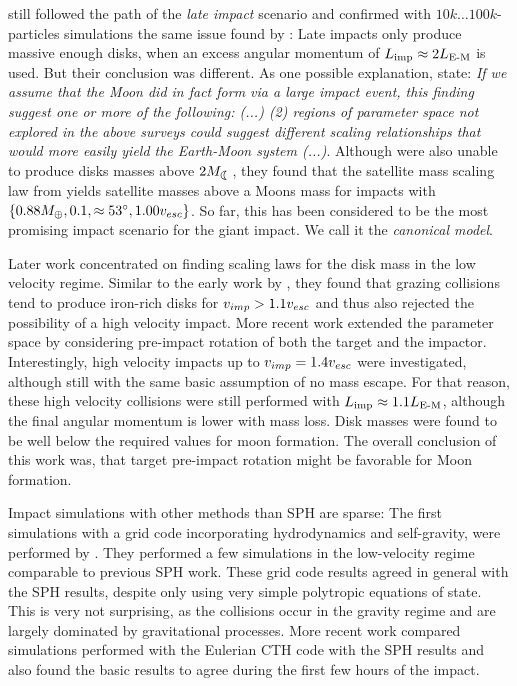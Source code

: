 \cite{Canup:2001p3295} still followed the path of the \emph{late impact} scenario and confirmed with $10k \dots100k$-particles simulations the same issue found by \cite{Cameron:2000p1854}: Late impacts only produce massive enough disks, when an excess angular momentum of $L_{\textrm{imp}} \approx 2 L_{\textrm{E-M}}$ is used. But their conclusion was different. As one possible explanation, \cite{Canup:2001p3295} state: \emph{If we assume that the Moon did in fact form via a large impact event, this finding suggest one or more of the following: (...) (2) regions of parameter space not explored in the above surveys could suggest different scaling relationships that would more easily yield the Earth-Moon system (...)}. Although \cite{Canup:2001p1861} were also unable to produce disks masses above $2 \ML$, they found that the satellite mass scaling law from  \citep{Kokubo:2000p2195} yields satellite masses above a Moons mass for impacts with $\{0.88 M_{\oplus}, 0.1, \approx 53 ^\circ, 1.00 v_{esc} \}$. So far, this has been considered to be the most promising impact scenario for the giant impact. We call it the \emph{canonical model}.

Later work \citep{Canup:2004p115} concentrated on finding scaling laws for the disk mass in the low velocity regime. Similar to the early work by \cite{Benz:1989p1893}, they found that grazing collisions tend to produce iron-rich disks for $v_{imp} > 1.1 v_{esc}$ and thus also rejected the possibility of a high velocity impact. More recent work \citep{Canup:2008p3551} extended the parameter space by considering pre-impact rotation of both the target and the impactor. Interestingly, high velocity impacts up to $v_{imp} = 1.4 v_{esc}$ were investigated, although still with the same basic assumption of no mass escape. For that reason, these high velocity collisions were still performed with $L_{\textrm{imp}} \approx 1.1 L_{\textrm{E-M}}$, although the final angular momentum is lower with mass loss. Disk masses were found to be well below the required values for moon formation. The overall conclusion of this work was, that target pre-impact rotation might be favorable for Moon formation.

Impact simulations with other methods than SPH are sparse: The first simulations with a grid code incorporating hydrodynamics and self-gravity, were performed by \cite{Wada:2006p1013}. They performed a few simulations in the low-velocity regime comparable to previous SPH work. These grid code results agreed in general with the SPH results, despite only using very simple polytropic equations of state. This is very not surprising, as the collisions occur in the gravity regime and are largely dominated by gravitational processes. More recent work \citep{Canup:2010p3713} compared simulations performed with the Eulerian CTH code with the SPH results and also found the basic results to agree during the first few hours of the impact.

